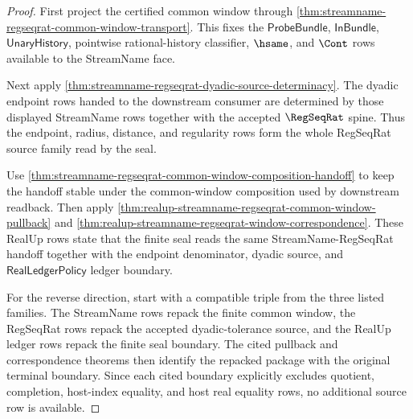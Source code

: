 \begin{proof}
First project the certified common window through
\autoref{thm:streamname-regseqrat-common-window-transport}. This fixes the
$\mathsf{ProbeBundle}$, $\mathsf{InBundle}$, $\mathsf{UnaryHistory}$,
pointwise rational-history classifier, $\hsame$, and $\Cont$ rows available to
the StreamName face.

Next apply \autoref{thm:streamname-regseqrat-dyadic-source-determinacy}. The
dyadic endpoint rows handed to the downstream consumer are determined by those
displayed StreamName rows together with the accepted $\RegSeqRat$ spine. Thus
the endpoint, radius, distance, and regularity rows form the whole RegSeqRat
source family read by the seal.

Use \autoref{thm:streamname-regseqrat-common-window-composition-handoff} to keep
the handoff stable under the common-window composition used by downstream
readback. Then apply
\autoref{thm:realup-streamname-regseqrat-common-window-pullback} and
\autoref{thm:realup-streamname-regseqrat-window-correspondence}. These RealUp
rows state that the finite seal reads the same StreamName-RegSeqRat handoff
together with the endpoint denominator, dyadic source, and
$\mathsf{RealLedgerPolicy}$ ledger boundary.

For the reverse direction, start with a compatible triple from the three listed
families. The StreamName rows repack the finite common window, the RegSeqRat rows
repack the accepted dyadic-tolerance source, and the RealUp ledger rows repack
the finite seal boundary. The cited pullback and correspondence theorems then
identify the repacked package with the original terminal boundary. Since each
cited boundary explicitly excludes quotient, completion, host-index equality,
and host real equality rows, no additional source row is available.
\end{proof}

